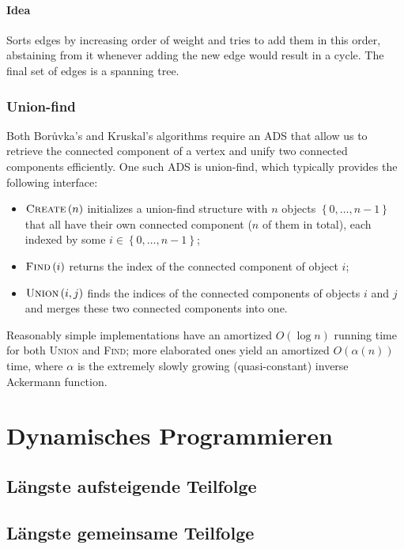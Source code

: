 \documentclass[a4paper]{article}
\begin{document}
\paragraph{Idea} Sorts edges by increasing order of weight and tries to add them in this order, abstaining from it whenever adding the new edge would result in a cycle. The final set of edges is a spanning tree.

\subsubsection{Union-find}

Both Bor\r{u}vka's and Kruskal's algorithms require an ADS that allow us to retrieve the connected component of a vertex and unify two connected components efficiently. One such ADS is union-find, which typically provides the following interface:
\begin{itemize}
\item $\textsc{Create}\left(n\right)$ initializes a union-find structure with $n$ objects $\left\lbrace 0, \dots, n-1\right\rbrace$ that all have their own connected component ($n$ of them in total), each indexed by some $i \in \left\lbrace 0, \dots, n-1\right\rbrace$;
\item $\textsc{Find}\left(i\right)$ returns the index of the connected component of object $i$;
\item $\textsc{Union}\left(i,j\right)$ finds the indices of the connected components of objects $i$ and $j$ and merges these two connected components into one.
\end{itemize}
Reasonably simple implementations have an amortized $O\left(\log n\right)$ running time for both \textsc{Union} and \textsc{Find}; more elaborated ones yield an amortized $O\left(\alpha\left(n\right)\right)$ time, where $\alpha$ is the extremely slowly growing (quasi-constant) inverse Ackermann function.





    
\section{Dynamisches Programmieren}

\subsection{Längste aufsteigende Teilfolge}

\subsection{Längste gemeinsame Teilfolge}
\end{document}
